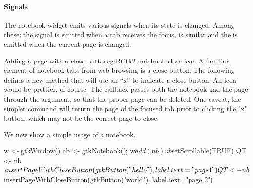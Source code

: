 \paragraph{Signals}
The notebook widget emits various signals when its state is
changed. Among these: the signal  is emitted when a tab receives the
focus,  is similar and the  is
emitted when the current page is changed.

\begin{example}{Adding a page with a close button}{eg:RGtk2-notebook-close-icon}
A familiar element of notebook tabs from web browsing is a close button. The following
defines a new method 
that will use an ``x'' to indicate a close button. An icon would be
prettier, of course. The callback passes both the notebook and the
page through the  argument, so that the proper page can be
deleted. One caveat, the simpler command 
will return the page of the focused tab prior to clicking the "x"
button, which may not be the correct page to close.

\begin{Schunk}
\end{Schunk}

We now show a simple usage of a notebook.
\begin{Schunk}
\begin{Sinput}
 w <- gtkWindow()
 nb <- gtkNotebook(); w$add(nb)
 nb$setScrollable(TRUE)
 QT <- nb$insertPageWithCloseButton(gtkButton("hello"), label.text="page 1")
 QT <- nb$insertPageWithCloseButton(gtkButton("world"), label.text="page 2")
\end{Sinput}
\end{Schunk}
  
\end{example}


